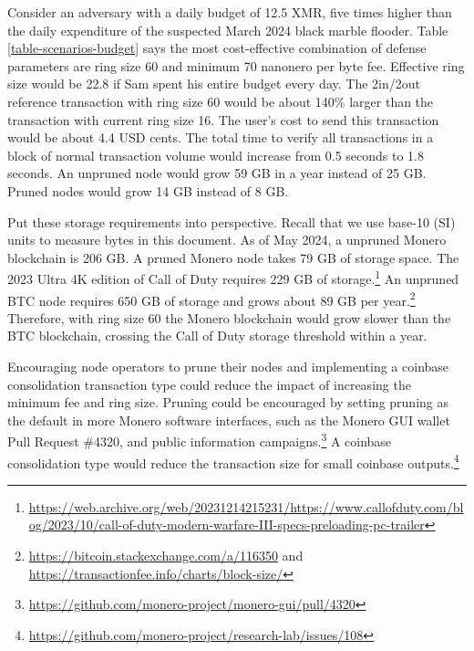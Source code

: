 \documentclass[english]{article}
\begin{document}
Consider an adversary with a daily budget of 12.5 XMR, five times
higher than the daily expenditure of the suspected March 2024 black
marble flooder. Table \ref{table-scenarios-budget} says the most
cost-effective combination of defense parameters are ring size 60
and minimum 70 nanonero per byte fee. Effective ring size would be
22.8 if Sam spent his entire budget every day. The 2in/2out reference
transaction with ring size 60 would be about 140\% larger than the
transaction with current ring size 16. The user's cost to send this
transaction would be about 4.4 USD cents. The total time to verify
all transactions in a block of normal transaction volume would increase
from 0.5 seconds to 1.8 seconds. An unpruned node would grow 59 GB
in a year instead of 25 GB. Pruned nodes would grow 14 GB instead
of 8 GB. 

Put these storage requirements into perspective. Recall that we use
base-10 (SI) units to measure bytes in this document. As of May 2024,
a unpruned Monero blockchain is 206 GB. A pruned Monero node takes
79 GB of storage space. The 2023 Ultra 4K edition of Call of Duty
requires 229 GB of storage.\footnote{{\scriptsize{}\url{https://web.archive.org/web/20231214215231/https://www.callofduty.com/blog/2023/10/call-of-duty-modern-warfare-III-specs-preloading-pc-trailer}}}
An unpruned BTC node requires 650 GB of storage and grows about 89
GB per year.\footnote{\url{https://bitcoin.stackexchange.com/a/116350} and \url{https://transactionfee.info/charts/block-size/}}
Therefore, with ring size 60 the Monero blockchain would grow slower
than the BTC blockchain, crossing the Call of Duty storage threshold
within a year.

Encouraging node operators to prune their nodes and implementing a
coinbase consolidation transaction type could reduce the impact of
increasing the minimum fee and ring size. Pruning could be encouraged
by setting pruning as the default in more Monero software interfaces,
such as the Monero GUI wallet Pull Request \#4320, and public information
campaigns.\footnote{\url{https://github.com/monero-project/monero-gui/pull/4320}}
A coinbase consolidation type would reduce the transaction size for
small coinbase outputs.\footnote{\url{https://github.com/monero-project/research-lab/issues/108}}
\end{document}
